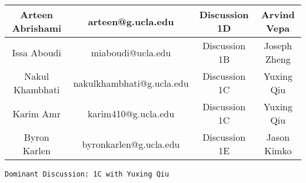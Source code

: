 \documentclass[10pt, letterpaper]{article}
\begin{document}
\begin{table}
	\begin{tabular}{| c c c c |}
		
		\hline
		Arteen Abrishami & arteen@g.ucla.edu & Discussion 1D & Arvind Vepa \\
		\hline
		Issa Aboudi & miaboudi@ucla.edu & Discussion 1B & Joseph Zheng \\
		\hline
		Nakul Khambhati & nakulkhambhati@g.ucla.edu & Discussion 1C & Yuxing Qiu \\
		\hline
		Karim Amr & karim410@g.ucla.edu & Discussion 1C & Yuxing Qiu \\
		\hline
		Byron Karlen & byronkarlen@g.ucla.edu & Discussion 1E & Jason Kimko\\
		\hline
		
	\end{tabular}
\end{table}
\texttt{Dominant Discussion: 1C with Yuxing Qiu}
\end{document}
